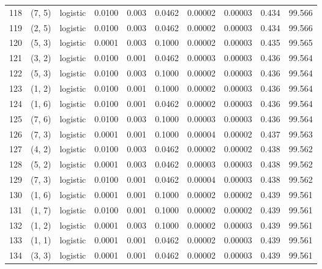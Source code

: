 \begin{tabular}{lllrrrrrrr}
118 &      (7, 5) &  logistic &  0.0100 &  0.003 &  0.0462 &          0.00002 &    0.00003 &       0.434 &    99.566 \\
119 &      (2, 5) &  logistic &  0.0100 &  0.003 &  0.0462 &          0.00002 &    0.00003 &       0.434 &    99.566 \\
120 &      (5, 3) &  logistic &  0.0001 &  0.003 &  0.1000 &          0.00002 &    0.00003 &       0.435 &    99.565 \\
121 &      (3, 2) &  logistic &  0.0100 &  0.001 &  0.0462 &          0.00003 &    0.00003 &       0.436 &    99.564 \\
122 &      (5, 3) &  logistic &  0.0100 &  0.003 &  0.1000 &          0.00002 &    0.00003 &       0.436 &    99.564 \\
123 &      (1, 2) &  logistic &  0.0100 &  0.001 &  0.1000 &          0.00002 &    0.00003 &       0.436 &    99.564 \\
124 &      (1, 6) &  logistic &  0.0100 &  0.001 &  0.0462 &          0.00002 &    0.00003 &       0.436 &    99.564 \\
125 &      (7, 6) &  logistic &  0.0100 &  0.003 &  0.1000 &          0.00003 &    0.00003 &       0.436 &    99.564 \\
126 &      (7, 3) &  logistic &  0.0001 &  0.001 &  0.1000 &          0.00004 &    0.00002 &       0.437 &    99.563 \\
127 &      (4, 2) &  logistic &  0.0100 &  0.003 &  0.0462 &          0.00002 &    0.00002 &       0.438 &    99.562 \\
128 &      (5, 2) &  logistic &  0.0001 &  0.003 &  0.0462 &          0.00003 &    0.00003 &       0.438 &    99.562 \\
129 &      (7, 3) &  logistic &  0.0100 &  0.001 &  0.0462 &          0.00004 &    0.00003 &       0.438 &    99.562 \\
130 &      (1, 6) &  logistic &  0.0001 &  0.001 &  0.1000 &          0.00002 &    0.00002 &       0.439 &    99.561 \\
131 &      (1, 7) &  logistic &  0.0100 &  0.001 &  0.1000 &          0.00002 &    0.00002 &       0.439 &    99.561 \\
132 &      (1, 2) &  logistic &  0.0001 &  0.003 &  0.1000 &          0.00002 &    0.00003 &       0.439 &    99.561 \\
133 &      (1, 1) &  logistic &  0.0001 &  0.001 &  0.0462 &          0.00002 &    0.00003 &       0.439 &    99.561 \\
134 &      (3, 3) &  logistic &  0.0001 &  0.001 &  0.0462 &          0.00002 &    0.00003 &       0.439 &    99.561 \\

\end{tabular}
